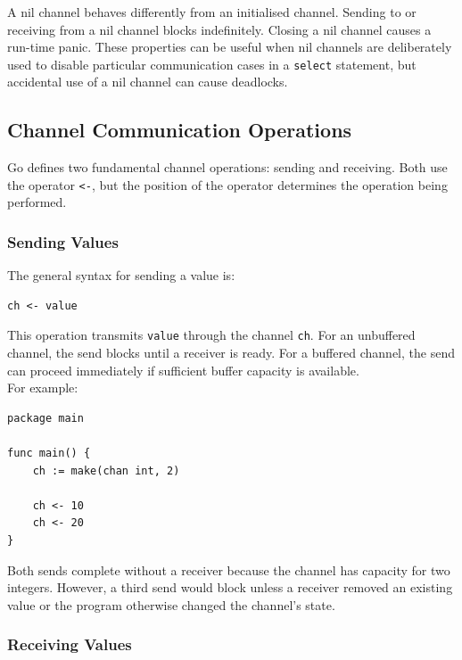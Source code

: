 A nil channel behaves differently from an initialised channel. Sending to or receiving from a nil channel blocks indefinitely. Closing a nil channel causes a run-time panic. These properties can be useful when nil channels are deliberately used to disable particular communication cases in a \texttt{select} statement, but accidental use of a nil channel can cause deadlocks.

\subsection{Channel Communication Operations}

Go defines two fundamental channel operations: sending and receiving. Both use the operator \texttt{<-}, but the position of the operator determines the operation being performed.\\

\subsubsection{Sending Values}

The general syntax for sending a value is:

\begin{lstlisting}
ch <- value
\end{lstlisting}

This operation transmits \texttt{value} through the channel \texttt{ch}. For an unbuffered channel, the send blocks until a receiver is ready. For a buffered channel, the send can proceed immediately if sufficient buffer capacity is available.\\

For example:

\begin{lstlisting}
package main

func main() {
    ch := make(chan int, 2)

    ch <- 10
    ch <- 20
}
\end{lstlisting}

Both sends complete without a receiver because the channel has capacity for two integers. However, a third send would block unless a receiver removed an existing value or the program otherwise changed the channel's state.

\subsubsection{Receiving Values}

